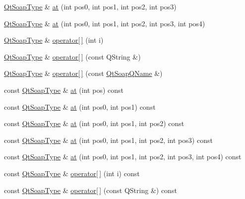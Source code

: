 \begin{DoxyCompactItemize}
\item 
\mbox{\hyperlink{class_qt_soap_type}{Qt\+Soap\+Type}} \& \mbox{\hyperlink{class_qt_soap_array_a3d9b7e09e7c7fdac354b5d8f11a51daa}{at}} (int pos0, int pos1, int pos2, int pos3)
\item 
\mbox{\hyperlink{class_qt_soap_type}{Qt\+Soap\+Type}} \& \mbox{\hyperlink{class_qt_soap_array_afa1072c72234f76cd63af16ec88972e4}{at}} (int pos0, int pos1, int pos2, int pos3, int pos4)
\item 
\mbox{\hyperlink{class_qt_soap_type}{Qt\+Soap\+Type}} \& \mbox{\hyperlink{class_qt_soap_array_a52701f0a8b5554e9cd51675d6b86ed00}{operator\mbox{[}$\,$\mbox{]}}} (int i)
\item 
\mbox{\hyperlink{class_qt_soap_type}{Qt\+Soap\+Type}} \& \mbox{\hyperlink{class_qt_soap_array_a4028a389d34e4420d3b5a37f44817f51}{operator\mbox{[}$\,$\mbox{]}}} (const Q\+String \&)
\item 
\mbox{\hyperlink{class_qt_soap_type}{Qt\+Soap\+Type}} \& \mbox{\hyperlink{class_qt_soap_array_a300d7ae39e79d76fb6c17cb8e0e2607a}{operator\mbox{[}$\,$\mbox{]}}} (const \mbox{\hyperlink{class_qt_soap_q_name}{Qt\+Soap\+Q\+Name}} \&)
\item 
const \mbox{\hyperlink{class_qt_soap_type}{Qt\+Soap\+Type}} \& \mbox{\hyperlink{class_qt_soap_array_afa9b9c1a5401d07d917f3998e625dbc3}{at}} (int pos) const
\item 
const \mbox{\hyperlink{class_qt_soap_type}{Qt\+Soap\+Type}} \& \mbox{\hyperlink{class_qt_soap_array_ac5ea1b439e350850fa97a884034815d3}{at}} (int pos0, int pos1) const
\item 
const \mbox{\hyperlink{class_qt_soap_type}{Qt\+Soap\+Type}} \& \mbox{\hyperlink{class_qt_soap_array_a28f7615e8dda6fa81f04ce2272b1186b}{at}} (int pos0, int pos1, int pos2) const
\item 
const \mbox{\hyperlink{class_qt_soap_type}{Qt\+Soap\+Type}} \& \mbox{\hyperlink{class_qt_soap_array_a8f93f6de05f6ea85419d80dee7405ea8}{at}} (int pos0, int pos1, int pos2, int pos3) const
\item 
const \mbox{\hyperlink{class_qt_soap_type}{Qt\+Soap\+Type}} \& \mbox{\hyperlink{class_qt_soap_array_ab83a0dcf4e7029ea01a6301e6943af92}{at}} (int pos0, int pos1, int pos2, int pos3, int pos4) const
\item 
const \mbox{\hyperlink{class_qt_soap_type}{Qt\+Soap\+Type}} \& \mbox{\hyperlink{class_qt_soap_array_ae5fc26685177339767ec39f8fd900738}{operator\mbox{[}$\,$\mbox{]}}} (int i) const
\item 
const \mbox{\hyperlink{class_qt_soap_type}{Qt\+Soap\+Type}} \& \mbox{\hyperlink{class_qt_soap_array_a30dcde4acdc6b8d7c2557b10f32efe10}{operator\mbox{[}$\,$\mbox{]}}} (const Q\+String \&) const

\end{DoxyCompactItemize}
